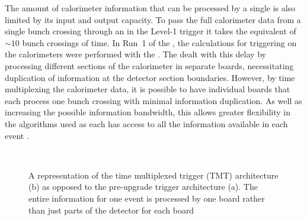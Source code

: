 The amount of calorimeter information that can be processed by a single
\FPGA is also limited by its input and output capacity. To pass the full
calorimeter data from a single bunch crossing through an \FPGA in the Level-1 trigger
it takes the equivalent of $\sim10$ bunch crossings of time. In Run~1
of the \LHC, the calculations for triggering on the calorimeters were
performed with the \GCT. The \GCT dealt with this delay by
processing different sections of the calorimeter in separate boards,
necessitating duplication of information at the detector section
boundaries. However, by time multiplexing the calorimeter data, it is
possible to have individual \FPGA boards that each process one bunch
crossing with minimal information duplication. As well as increasing the
possible information bandwidth, this allows greater flexibility
in the algorithms used as each \FPGA has access to all the information available
in each event \cite{1748-0221-9-10-C10034,1748-0221-7-01-C01060}. 

\begin{figure}
  \centering
  ~~
   \\
  \caption{A representation of the time multiplexed trigger (TMT)
  architecture (b) as opposed to the pre-upgrade trigger architecture
  (a). The entire information for one event is processed by one board
  rather than just parts of the detector for each board \cite{1748-0221-9-10-C10034}}
  \label{fig:tmt}
\end{figure}


